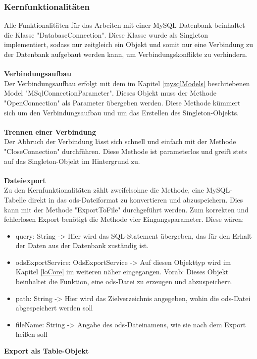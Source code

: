 \subsubsection{Kernfunktionalitäten}
\label{mysqlCore}
Alle Funktionalitäten für das Arbeiten mit einer MySQL-Datenbank beinhaltet die Klasse "DatabaseConnection". Diese Klasse wurde als Singleton implementiert, sodass nur zeitgleich ein Objekt und somit nur eine Verbindung zu der Datenbank aufgebaut werden kann, um Verbindungskonflikte zu verhindern.\\\\
\textbf{Verbindungsaufbau}\\
Der Verbindungsaufbau erfolgt mit dem im Kapitel \ref{mysqlModels} beschriebenen Model "MSqlConnectionParameter". Dieses Objekt muss der Methode "OpenConnection" als Parameter übergeben werden. Diese Methode kümmert sich um den Verbindungsaufbau und um das Erstellen des Singleton-Objekts.\\\\
\textbf{Trennen einer Verbindung}\\
Der Abbruch der Verbindung lässt sich schnell und einfach mit der Methode "CloseConnection" durchführen. Diese Methode ist parameterlos und greift stets auf das Singleton-Objekt im Hintergrund zu.\\\\
\textbf{Dateiexport}\\
Zu den Kernfunktionalitäten zählt zweifelsohne die Methode, eine MySQL-Tabelle direkt in das ods-Dateiformat zu konvertieren und abzuspeichern. Dies kann mit der Methode "ExportToFile" durchgeführt werden. Zum korrekten und fehlerlosen Export benötigt die Methode vier Eingangsparameter. Diese wären:
\begin{itemize}
\item query: String -> Hier wird das SQL-Statement übergeben, das für den Erhalt der Daten aus der Datenbank zuständig ist.
\item odsExportService: OdsExportService -> Auf diesen Objekttyp wird im Kapitel \ref{loCore} im weiteren näher eingegangen. Vorab: Dieses Objekt beinhaltet die Funktion, eine ods-Datei zu erzeugen und abzuspeichern.
\item path: String -> Hier wird das Zielverzeichnis angegeben, wohin die ods-Datei abgespeichert werden soll
\item fileName: String -> Angabe des ods-Dateinamens, wie sie nach dem Export heißen soll 
\end{itemize}
\textbf{Export als Table-Objekt}\\
